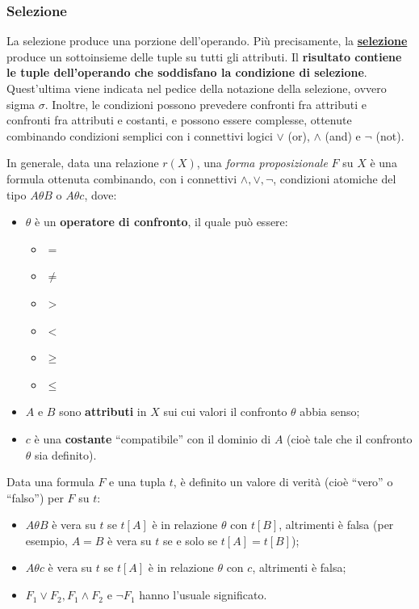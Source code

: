 \documentclass[a4paper]{article}
\newcommand{\dquotes}[1]{``#1''}
\begin{document}
	\newpage
	
	\subsubsection{Selezione}
	
	La selezione produce una porzione dell'operando. Più precisamente, la \textcolor{Red3}{\textbf{\underline{selezione}}} produce un sottoinsieme delle tuple su tutti gli attributi. Il \textbf{risultato contiene le tuple dell'operando che soddisfano la condizione di selezione}. Quest'ultima viene indicata nel pedice della notazione della selezione, ovvero sigma $\sigma$. Inoltre, le condizioni possono prevedere confronti fra attributi e confronti fra attributi e costanti, e possono essere complesse, ottenute combinando condizioni semplici con i connettivi logici $\lor$ (or), $\land$ (and) e $\lnot$ (not).\newline
	
	\noindent
	In generale, data una relazione $r\left(X\right)$, una \emph{forma proposizionale} $F$ su $X$ è una formula ottenuta combinando, con i connettivi $\land, \lor, \lnot$, condizioni atomiche del tipo $A\theta B$ o $A\theta c$, dove:
	
	\begin{itemize}
		\item $\theta$ è un \textbf{operatore di confronto}, il quale può essere:
		\begin{itemize}
			\item $=$
			\item $\ne$
			\item $>$
			\item $<$
			\item $\ge$
			\item $\le$
		\end{itemize}
	
		\item $A$ e $B$ sono \textbf{attributi} in $X$ sui cui valori il confronto $\theta$ abbia senso;
		
		\item $c$ è una \textbf{costante} \dquotes{compatibile} con il dominio di $A$ (cioè tale che il confronto $\theta$ sia definito).
	\end{itemize}
	
	\noindent
	Data una formula $F$ e una tupla $t$, è definito un valore di verità (cioè \dquotes{vero} o \dquotes{falso}) per $F$ su $t$:
	
	\begin{itemize}
		\item $A \theta B$ è vera su $t$ se $t\left[A\right]$ è in relazione $\theta$ con $t\left[B\right]$, altrimenti è falsa (per esempio, $A = B$ è vera su $t$ se e solo se $t\left[A\right] = t\left[B\right]$);
		
		\item $A \theta c$ è vera su $t$ se $t\left[A\right]$ è in relazione $\theta$ con $c$, altrimenti è falsa;
		
		\item $F_{1} \lor F_{2}, F_{1} \land F_{2}$ e $\lnot F_{1}$ hanno l'usuale significato.
	\end{itemize}
\end{document}

